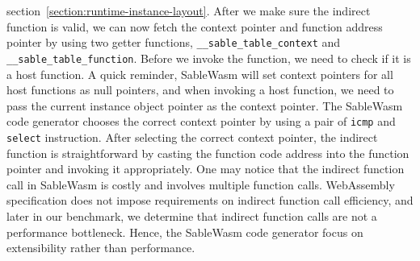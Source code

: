 section~\ref{section:runtime-instance-layout}. After we make sure the indirect
function is valid, we can now
fetch the context pointer and function address pointer by using two getter
functions, \texttt{\_\_sable\_table\_context} and
\texttt{\_\_sable\_table\_function}. Before we invoke the function, we need to
check if it is a host function. A quick reminder, SableWasm will set context
pointers for all host functions as null pointers, and when invoking a host
function, we need to pass the current instance object pointer as the context
pointer. The SableWasm code generator chooses the correct context pointer by
using a pair of \texttt{icmp} and \texttt{select} instruction. After selecting
the correct context pointer, the indirect function is straightforward by
casting the function code address into the function pointer and invoking it
appropriately. One may notice that the indirect function call in SableWasm is
costly and involves multiple function calls. WebAssembly specification does not
impose requirements on indirect function call efficiency, and later in our
benchmark, we determine that indirect function calls are not a performance
bottleneck. Hence, the SableWasm code generator focus on extensibility rather
than performance.

